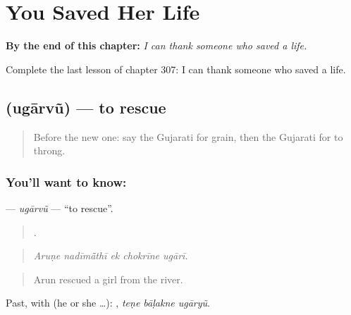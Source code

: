 
\chapter{You Saved Her Life}
\label{ch:gu-you-saved-her-life}

\begin{chapteropening}
\textbf{By the end of this chapter:} \emph{I can thank someone who saved a life.}

Complete the last lesson of chapter 307: I can thank someone who saved a life.
\end{chapteropening}

\section[\texorpdfstring{\gu{ઉગારવું} (ugārvũ)}{ઉગારવું (ugārvũ)}]{ (ugārvũ) — to rescue}

\label{lesson:GU-C307-ugarvu}



\begin{quote}
Before the new one: say the Gujarati for grain, then the Gujarati for to throng.
\end{quote}

\subsection*{You'll want to know: }
\textbf{} — \emph{ugārvũ} — \textquotedblleft{}to rescue\textquotedblright{}.

\begin{quote}
    .
\end{quote}

\begin{quote}
\emph{Aruṇe nadīmā̃thī ek chokrīne ugārī.}
\end{quote}

\begin{quote}
Arun rescued a girl from the river.
\end{quote}

Past, with  (he or she …):   , \emph{teṇe bāḷakne ugāryũ}.


